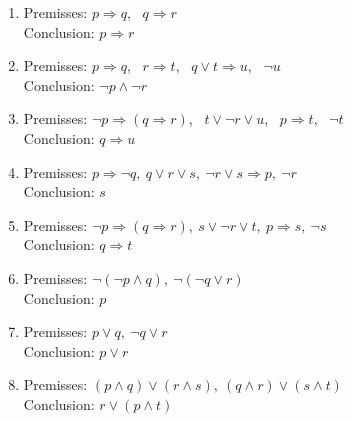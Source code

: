 \begin{enumerate}

\item Premisses: $p \Rightarrow q$, \ $q \Rightarrow r$ \\
      Conclusion: $p \Rightarrow r$
\item Premisses: $p \Rightarrow q$, \ $r \Rightarrow t$, \ $q \vee t \Rightarrow u$, \ $\neg u$ \\
      Conclusion: $\neg p \wedge \neg r$
\item Premisses: $\neg p \Rightarrow (q \Rightarrow r)$, \ $t \vee \neg r \vee u$, \ $p \Rightarrow t$, \ $\neg t$ \\
      Conclusion: $q \Rightarrow u$
			
			
\item Premisses: $p \Rightarrow \neg q, \ q \vee r \vee s, \ \neg r \vee s \Rightarrow p, \ \neg r$  \\
			Conclusion: $s$
			
			
\item Premisses: $\neg p \Rightarrow (q \Rightarrow r), \ s \vee \neg r \vee t, \ p \Rightarrow s, \ \neg s$ \\
			Conclusion: $q \Rightarrow t$
			
			
 \item Premisses: $\neg ( \neg p \wedge q), \ \neg (\neg q \vee r)$ \\
       Conclusion: $p$
 \item Premisses: $p \vee q, \ \neg q \vee r$ \\
       Conclusion: $p \vee r$
 \item Premisses: $(p \wedge q) \vee (r \wedge s), \ (q \wedge r) \vee (s \wedge t)$ \\
       Conclusion: $r \vee (p \wedge t)$

\end{enumerate}

